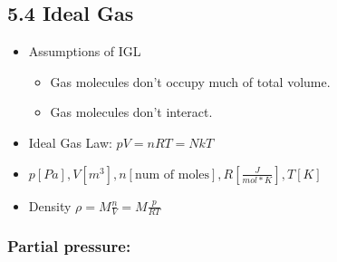 \subsection{5.4 Ideal Gas}
    \begin{itemize}
        \itemsep0em
        \item Assumptions of IGL\:
        \begin{itemize}
            \itemsep0em
            \item Gas molecules don't occupy much of total volume.
            \item Gas molecules don't interact.
        \end{itemize}
        \item Ideal Gas Law: $pV = nRT=N kT$
        \item $p\left[Pa\right], V\left[m^3\right], n\left[\text{num of moles}\right], R\left[\frac{J}{mol*K}\right], T\left[K\right]$
        \item Density $\rho = M\frac{n}{V}=M\frac{p}{RT}$
    \end{itemize}
    \subsubsection{Partial pressure:}
